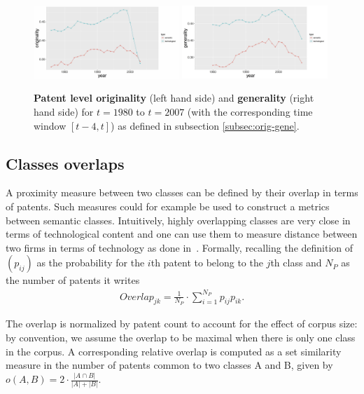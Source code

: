 \documentclass[12pt,twoside,a4paper]{article}
\begin{document}
\begin{figure}
\includegraphics[width=0.49\textwidth]{originality.jpg}
\includegraphics[width=0.49\textwidth]{generality.jpg}\\
\caption{\textbf{Patent level originality} (left hand side) and \textbf{generality} (right hand side)  for $t=1980$ to $t=2007$ (with the corresponding time window $[t-4,t]$) as defined in subsection \ref{subsec:orig-gene}. }
\label{fig:orig-gene}
\end{figure}

\subsection{Classes overlaps} \label{subsec:overlaps}

A proximity measure between two classes can be defined by their overlap in terms of patents. 
Such measures could for example be used to construct a metrics between semantic classes. Intuitively, highly overlapping classes are very close in terms of technological content and one can use them to measure distance between two firms in terms of technology as done in~\cite{Bloom2005distance}. Formally, recalling the definition of $\left(p_{ij}\right)$ as the probability for the $i$th patent to belong to the $j$th class and $N_P$ as the number of patents it writes 
\begin{eqnarray}
\label{overlap}
Overlap_{jk} = \frac{1}{N_P}\cdot \sum_{i=1}^{N_P} p_{ij} p_{ik}. 
\end{eqnarray}

The overlap is normalized by patent count to account for the effect of corpus size: by convention, we assume the overlap to be maximal when there is only one class in the corpus. A corresponding relative overlap is computed as a set similarity measure in the number of patents common to two classes A and B, given by $o(A,B)=2\cdot \frac{\left|A\cap B\right|}{\left|A\right| + \left|B\right|}$.
\end{document}
